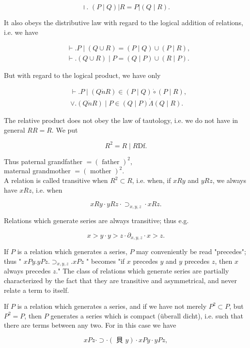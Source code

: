 \documentclass[10pt]{article}
\begin{document}
$$
\text { ।. }(P \mid Q)|R=P|(Q \mid R) \text {. }
$$

It also obeys the distributive law with regard to the logical addition of relations, i.e. we have

$$
\begin{aligned}
& \vdash . P \mid(Q \cup R)=(P \mid Q) \cup(P \mid R), \\
& \vdash .(Q \cup R) \mid P=(Q \mid P) \cup(R \mid P) .
\end{aligned}
$$

But with regard to the logical product, we have only

$$
\begin{aligned}
& \vdash . P \mid(Q \dot{n} R) \in(P \mid Q) \dot{\circ}(P \mid R), \\
& \vee .(Q \dot{n} R) \mid P \in(Q \mid P) \dot{\Lambda}(Q \mid R) .
\end{aligned}
$$

The relative product does not obey the law of tautology, i.e. we do not have in general $R R=R$. We put

$$
R^{2}=R \mid R \mathrm{Df} .
$$

Thus paternal grandfather $=(\text { father })^{2}$,\\
maternal grandmother $=(\text { mother })^{2}$.\\
A relation is called transitive when $R^{2} \subset R$, i.e. when, if $x R y$ and $y R z$, we always have $x R z$, i.e. when

$$
x R y \cdot y R z \cdot \supset_{x, y, z} \cdot x R z .
$$

Relations which generate series are always transitive; thus e.g.

$$
x>y \cdot y>z \cdot \partial_{x, y, z} \cdot x>z .
$$

If $P$ is a relation which generates a series, $P$ may conveniently be read "precedes"; thus " $x P y . y P z . \supset_{x, y, z} . x P z$ " becomes "if $x$ precedes $y$ and $y$ precedes $z$, then $x$ always precedes $z$." The class of relations which generate series are partially characterized by the fact that they are transitive and asymmetrical, and never relate a term to itself.

If $P$ is a relation which generates a series, and if we have not merely $P^{2} \subset P$, but $P^{2}=P$, then $P$ generates a series which is compact (überall dicht), i.e. such that there are terms between any two. For in this case we have

$$
x P z \cdot \supset \cdot(\text { 貝 } y) \cdot x P y \cdot y P z,
$$
\end{document}
